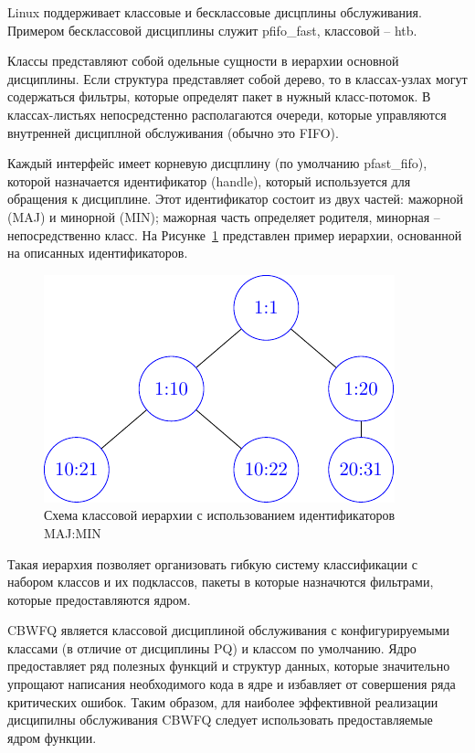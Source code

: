 	Linux поддерживает классовые и бесклассовые дисцплины обслуживания. Примером
	бесклассовой дисциплины служит pfifo\_fast, классовой -- htb.\cite{lartc}


	Классы представляют собой одельные сущности в иерархии основной дисциплины.
	Если структура представляет собой дерево, то в классах-узлах могут содержаться
	фильтры, которые определят пакет в нужный класс-потомок. В классах-листьях
	непосредстенно располагаются очереди, которые управляются внутренней дисциплной
	обслуживания (обычно это FIFO). 

	Каждый интерфейс имеет корневую дисцплину (по умолчанию pfast\_fifo), которой
	назначается идентификатор (handle), который используется для обращения к дисциплине.
	Этот идентификатор состоит из двух частей: мажорной (MAJ) и минорной (MIN); мажорная
	часть определяет родителя, минорная -- непосредственно класс. На Рисунке~\ref{pic:clheirh}
	представлен пример иерархии, основанной на описанных идентификаторов.

	\begin{figure}[ht!]
		\centering
		\includegraphics{./pdfimages/class_hierh.pdf}
		\caption{Схема классовой иерархии с использованием идентификаторов MAJ:MIN}
		\label{pic:clheirh}
	\end{figure}

	Такая иерархия позволяет организовать гибкую систему классификации с набором классов
	и их подклассов, пакеты в которые назначются фильтрами, которые предоставляются ядром.

	CBWFQ является классовой дисциплиной обслуживания с конфигурируемыми классами (в отличие от
	дисциплины PQ) и классом по умолчанию. Ядро предоставляет ряд полезных функций и структур
	данных, которые значительно упрощают написания необходимого кода в ядре и избавляет от
	совершения ряда критических ошибок. Таким образом, для наиболее эффективной реализации
	дисципилны обслуживания CBWFQ следует использовать предоставляемые ядром функции.

